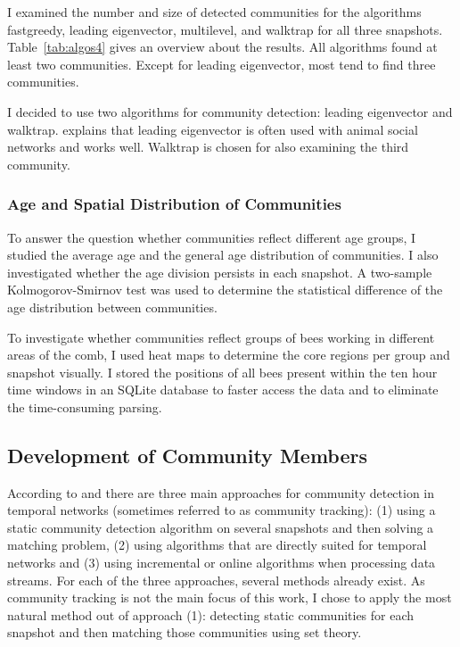 I examined the number and size of detected communities for the algorithms fastgreedy, leading eigenvector, multilevel, and walktrap for all three snapshots. Table~\ref{tab:algos4} gives an overview about the results.
All algorithms found at least two communities.
Except for leading eigenvector, most tend to find three communities.

I decided to use two algorithms for community detection: leading eigenvector and walktrap. \textcite{farine2015constructing} explains that leading eigenvector is often used with animal social networks and works well. Walktrap is chosen for also examining the third community.




\subsubsection{Age and Spatial Distribution of Communities}
To answer the question whether communities reflect different age groups, I studied the average age and the general age distribution of communities. I also investigated whether the age division persists in each snapshot. A two-sample Kolmogorov-Smirnov test was used to determine the statistical difference of the age distribution between communities.

To investigate whether communities reflect groups of bees working in different areas of the comb, I used heat maps to determine the core regions per group and snapshot visually.
I stored the positions of all bees present within the ten hour time windows in an SQLite database to faster access the data and to eliminate the time-consuming parsing.

\subsection{Development of Community Members}
\label{sec:bg:tracking}
According to \textcite{aynaud2013communities} and  \textcite{brodka2014community} there are three main approaches for community detection in temporal networks (sometimes referred to as community tracking): (1) using a static community detection algorithm on several snapshots and then solving a matching problem, (2) using algorithms that are directly suited for temporal networks and (3) using incremental or online algorithms when processing data streams. For each of the three approaches, several methods already exist.
As community tracking is not the main focus of this work, I chose to apply the most natural method out of approach (1): detecting static communities for each snapshot and then matching those communities using set theory.

